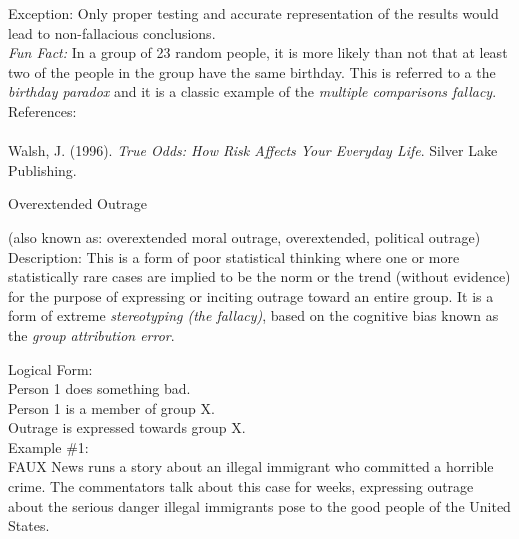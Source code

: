 \documentclass[a4paper,12pt,single,pdftex]{scrbook}
\begin{document}
    
      Exception: Only proper testing and accurate representation of the results would lead to non-fallacious conclusions.
    \\

    
      {\em Fun Fact:} In a group of 23 random people, it is more likely than not that at least two of the people in the group have the same birthday. This is referred to a the {\em birthday paradox} and it is a classic example of the {\em multiple comparisons fallacy}.
    \\

    
      References:
    \\

    
      
        
      \\

      
        
          Walsh, J. (1996). {\it True Odds: How Risk Affects Your Everyday Life}. Silver Lake Publishing.
        
      
    
  

Overextended Outrage
    
      (also known as: overextended moral outrage, overextended, political outrage)
    \\

  
    Description: This is a form of poor statistical thinking where one or more statistically rare cases are implied to be the norm or the trend (without evidence) for the purpose of expressing or inciting outrage toward an entire group. It is a form of extreme {\it stereotyping (the fallacy)}, based on the cognitive bias known as the {\it group attribution error}.

    
      Logical Form:
    \\

    
      Person 1 does something bad.
    \\

    
      Person 1 is a member of group X.
    \\

    
      Outrage is expressed towards group X.
    \\

    
      Example \#1:
    \\

    
      FAUX News runs a story about an illegal immigrant who committed a horrible crime. The commentators talk about this case for weeks, expressing outrage about the serious danger illegal immigrants pose to the good people of the United States.
    \\
\end{document}
